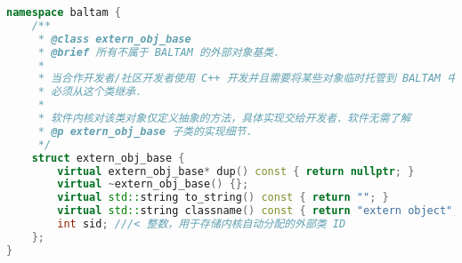 
\begin{issues}
\issueDraft
\end{issues}

\begin{lstlisting}[language=cpp, caption=extern\_obj.h节选]
namespace baltam {
    /**
     * @class extern_obj_base
     * @brief 所有不属于 BALTAM 的外部对象基类．
     *
     * 当合作开发者/社区开发者使用 C++ 开发并且需要将某些对象临时托管到 BALTAM 中时，
     * 必须从这个类继承．
     *
     * 软件内核对该类对象仅定义抽象的方法，具体实现交给开发者．软件无需了解
     * @p extern_obj_base 子类的实现细节．
     */
    struct extern_obj_base {
        virtual extern_obj_base* dup() const { return nullptr; }
        virtual ~extern_obj_base() {};
        virtual std::string to_string() const { return ""; }
        virtual std::string classname() const { return "extern object"; };
        int sid; ///< 整数，用于存储内核自动分配的外部类 ID
    };
}
\end{lstlisting}


